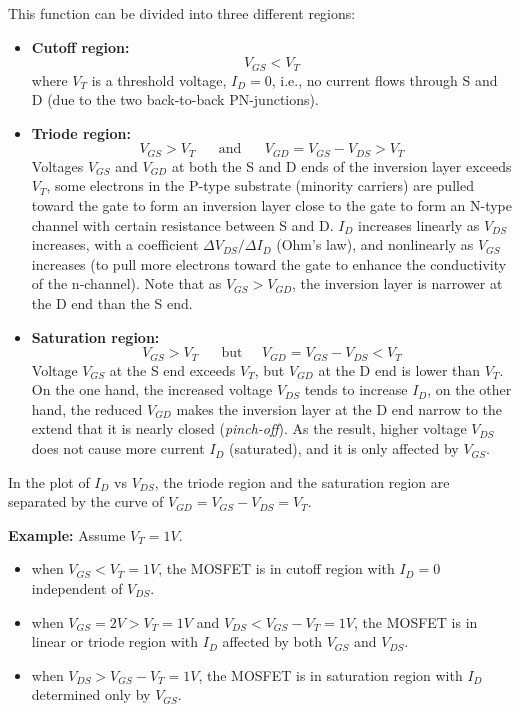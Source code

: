 \documentclass{article}
\begin{document}
This function can be divided into three different regions:

\begin{itemize}
  \item {\bf Cutoff region:} 
    \begin{equation}
    V_{GS} < V_T
    \end{equation}
    where $V_T$ is a threshold voltage, $I_D=0$, i.e., no current
    flows through S and D (due to the two back-to-back PN-junctions).

  \item {\bf Triode region:} 
    \begin{equation}
    V_{GS}>V_T\;\;\;\;\;\;\mbox{and}\;\;\;\;\;\;V_{GD}=V_{GS}-V_{DS}>V_T
    \end{equation}
    Voltages $V_{GS}$ and $V_{GD}$ at both the S and D ends of the 
    inversion layer exceeds $V_T$, some electrons in the P-type 
    substrate  (minority carriers) are pulled toward the gate to 
    form an inversion layer close to the gate to form an N-type 
    channel with certain resistance between S and D. $I_D$ 
    increases linearly as $V_{DS}$ increases, with a coefficient 
    $\Delta V_{DS}/\Delta I_D$ (Ohm's law), and nonlinearly as $V_{GS}$ 
    increases (to pull more electrons toward the gate to enhance the 
    conductivity of the n-channel). Note that as $V_{GS}>V_{GD}$, the 
    inversion layer is narrower at the D end than the S end.

  \item {\bf Saturation region:} 
    \begin{equation}
    V_{GS}>V_T\;\;\;\;\;\;\mbox{but}\;\;\;\;\; V_{GD}=V_{GS}-V_{DS}<V_T
    \end{equation}
    Voltage $V_{GS}$ at the S end exceeds $V_T$, but $V_{GD}$ at the D
    end is lower than $V_T$. On the one hand, the increased voltage 
    $V_{DS}$ tends to increase $I_D$, on the other hand, the reduced 
    $V_{GD}$ makes the inversion layer at the D end narrow to the extend
    that it is nearly closed ({\em pinch-off}). As the result, higher 
    voltage $V_{DS}$ does not  cause more current $I_D$ (saturated), and 
    it is only affected by $V_{GS}$.
 \end{itemize}

In the plot of $I_D$ vs $V_{DS}$, the triode region and the saturation
region are separated by the curve of $V_{GD}=V_{GS}-V_{DS}=V_T$. 

{\bf Example:} Assume $V_T=1V$.
\begin{itemize}
\item when $V_{GS}<V_T=1V$, the MOSFET is in cutoff region with $I_D=0$ 
  independent of $V_{DS}$.
\item when $V_{GS}=2V > V_T=1V$ and $V_{DS}<V_{GS}-V_T=1V$, the MOSFET is in 
  linear or triode region with $I_D$ affected by both $V_{GS}$ and $V_{DS}$.
\item when $V_{DS}>V_{GS}-V_T=1V$, the MOSFET is in saturation region with
  $I_D$ determined only by $V_{GS}$.
\end{itemize}
\end{document}

